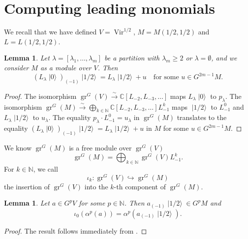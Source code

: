 \documentclass[a4paper, 12pt, reqno]{amsart}
\newtheorem{lemma}[theorem]{Lemma}
\theoremstyle{remark}
\DeclareMathOperator{\Vir}{Vir}
\DeclareMathOperator{\gr}{gr}
\DeclareMathOperator{\vac}{|0\rangle}
\DeclareMathOperator{\vachalf}{|1/2\rangle}
\begin{document}
\section{Computing leading monomials}
\label{sec:comp-lead-monom}

We recall that we have defined $V = \Vir^{1/2}$, $M = M(1/2, 1/2)$ and $L = L(1/2, 1/2)$.

\begin{lemma}
  \label{lmm:7}
  Let $\lambda = [\lambda_1, \dots, \lambda_m]$ be a partition with $\lambda_m \ge 2$ or $\lambda = \emptyset$, and we consider $M$ as a module over $V$.
  Then
  \begin{equation*}
    (L_{\lambda}\vac)_{(-1)}\vachalf = L_{\lambda}\vachalf + u \quad \text{for some $u \in G^{2m - 1}M$}.
  \end{equation*}
\end{lemma}

\begin{proof}
  The isomorphism $\gr^G(V) \xrightarrow{\sim} \mathbb{C}[L_{-2}, L_{-3}, \dots]$ maps $L_{\lambda}\vac$ to $p_{\lambda}$.
  The isomorphism $\gr^G(M) \xrightarrow{\sim} \bigoplus_{k \in \mathbb{N}}\mathbb{C}[L_{-2}, L_{-3}, \dots]L_{-1}^k$ maps $\vachalf$ to $L_{-1}^0$ and $L_{\lambda}\vachalf$ to $u_{\lambda}$.
  The equality $p_{\lambda}\cdot L_{-1}^0 = u_{\lambda}$ in $\gr^G(M)$ translates to the equality $(L_{\lambda}\vac)_{(-1)}\vachalf = L_{\lambda}\vachalf + u$ in $M$ for some $u \in G^{2m - 1}M$.
\end{proof}

We know $\gr^G(M)$ is a free module over $\gr^G(V)$
\begin{equation*}
  \gr^G(M) = \bigoplus_{k \in \mathbb{N}}\gr^G(V)L_{-1}^k.
\end{equation*}
For $k \in \mathbb{N}$, we call
\begin{equation*}
  \iota_k: \gr^G(V) \hookrightarrow \gr^G(M)
\end{equation*}
the insertion of $\gr^G(V)$ into the $k$-th component of $\gr^G(M)$.

\begin{lemma}
  \label{lmm:8}
  Let $a \in G^pV$ for some $p \in \mathbb{N}$.
  Then $a_{(-1)}\vachalf \in G^pM$ and
  \begin{equation*}
    \iota_0(\alpha^p(a)) = \alpha^p(a_{(-1)}\vachalf).
  \end{equation*}
\end{lemma}

\begin{proof}
  The result follows immediately from .
\end{proof}
\end{document}

